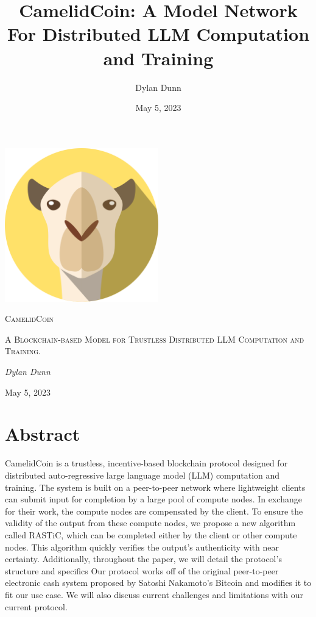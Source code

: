 \documentclass{article}
\title{CamelidCoin: A Model Network For Distributed LLM Computation and Training}
\author{Dylan Dunn}
\date{May 5, 2023}
\begin{document}
\begin{titlepage}
    \centering
    \includegraphics[width=0.5\textwidth]{logoLarge.png}\par\vspace{1cm}
    {\fontsize{40}{48}\selectfont\scshape CamelidCoin\par}
    \vspace{1cm}
    {\scshape\Large A Blockchain-based Model for Trustless Distributed LLM Computation and Training. \par}
    \vspace{2cm}
    {\Large\itshape Dylan Dunn\par}
    \vfill
    {\large May 5, 2023\par}
  \end{titlepage}
  

\section{Abstract}
CamelidCoin is a trustless, incentive-based blockchain protocol designed for distributed auto-regressive large language model (LLM) computation and training. 
The system is built on a peer-to-peer network where lightweight clients can submit input for completion by a large pool of compute nodes. 
In exchange for their work, the compute nodes are compensated by the client. 
To ensure the validity of the output from these compute nodes, we propose a new algorithm called RASTiC, which can be completed either by the client or other compute nodes. 
This algorithm quickly verifies the output's authenticity with near certainty. 
Additionally, throughout the paper, we will detail the protocol's structure and specifics
Our protocol works off of the original peer-to-peer electronic cash system proposed by Satoshi Nakamoto's Bitcoin and modifies it to fit our use case. 
We will also discuss current challenges and limitations with our current protocol.
\end{document}
